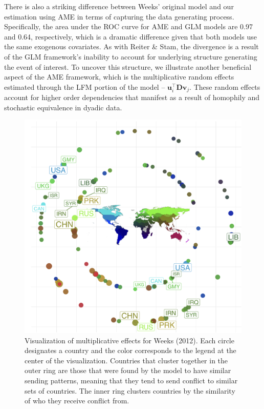 There is also a striking difference between Weeks' original model and our estimation using AME in terms of capturing the data generating process. Specifically, the area under the ROC curve for AME and GLM models are 0.97 and 0.64, respectively, which is a dramatic difference given that both models use the same exogenous covariates. As with Reiter \& Stam, the divergence is a result of the GLM framework's inability to account for underlying structure generating the event of interest. To uncover this structure, we illustrate another beneficial aspect of the AME framework, which is the multiplicative random effects estimated through the LFM portion of the model -- $\mathbf{u}_{i}^{\top} \mathbf{D} \mathbf{v}_{j}$. These random effects account for higher order dependencies that manifest as a result of homophily and stochastic equivalence in dyadic data. 

\begin{figure}[!h]
	\includegraphics[width=\textwidth]{graphics/weeks_circPlot.png}
	\caption{ Visualization of multiplicative effects for Weeks (2012). Each circle designates a country and the color corresponds to the legend at the center of the visualization. Countries that cluster together in the outer ring are those that were found by the model to have similar sending patterns, meaning that they tend to send conflict to similar sets of countries. The inner ring clusters countries by the similarity of who they receive conflict from. 
	}
	\label{fig:weekscirc}
\end{figure}
\FloatBarrier

